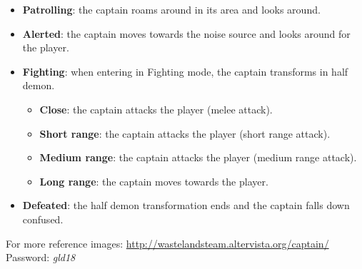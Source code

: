 \begin{itemize}
	\item \textbf{Patrolling}: the captain roams around in its area and looks around.
	\item \textbf{Alerted}: the captain moves towards the noise source and looks around for the player.
	\item \textbf{Fighting}: when entering in Fighting mode, the captain transforms in half demon.
	\begin{itemize}
		\item \textbf{Close}: the captain attacks the player (melee attack).
		\item \textbf{Short range}: the captain attacks the player (short range attack).
		\item \textbf{Medium range}: the captain attacks the player (medium range attack).
		\item \textbf{Long range}: the captain moves towards the player.
	\end{itemize}
	\item \textbf{Defeated}: the half demon transformation ends and the captain falls down confused.
\end{itemize}

For more reference images: \url{http://wastelandsteam.altervista.org/captain/}\\
Password: \textit{gld18}
